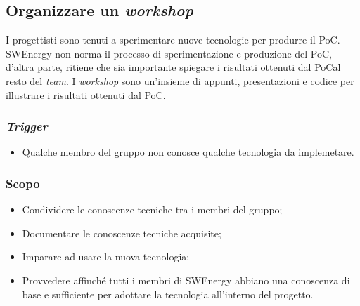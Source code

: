\subsection{Organizzare un \textit{workshop}}
\label{organizzare-workshop}

I progettisti sono tenuti a sperimentare nuove tecnologie per produrre il PoC\g. 
SWEnergy non norma il processo di sperimentazione e produzione del PoC\g, d'altra parte, ritiene che sia importante spiegare i risultati ottenuti dal PoC\g al resto del \textit{team}. I \textit{workshop} sono un'insieme di appunti, presentazioni e codice per illustrare i risultati ottenuti dal PoC\g.

\subsubsection{\textit{Trigger}}
\begin{itemize}
	\item Qualche membro del gruppo non conosce qualche tecnologia da
	      implemetare.
\end{itemize}

\subsubsection{Scopo}
\begin{itemize}
	\item Condividere le conoscenze tecniche tra i membri del gruppo;

	\item Documentare le conoscenze tecniche acquisite;

	\item Imparare ad usare la nuova tecnologia;

	\item Provvedere affinché tutti i membri di SWEnergy abbiano una conoscenza
	      di base e sufficiente per adottare la tecnologia all'interno del
	      progetto.
\end{itemize}

